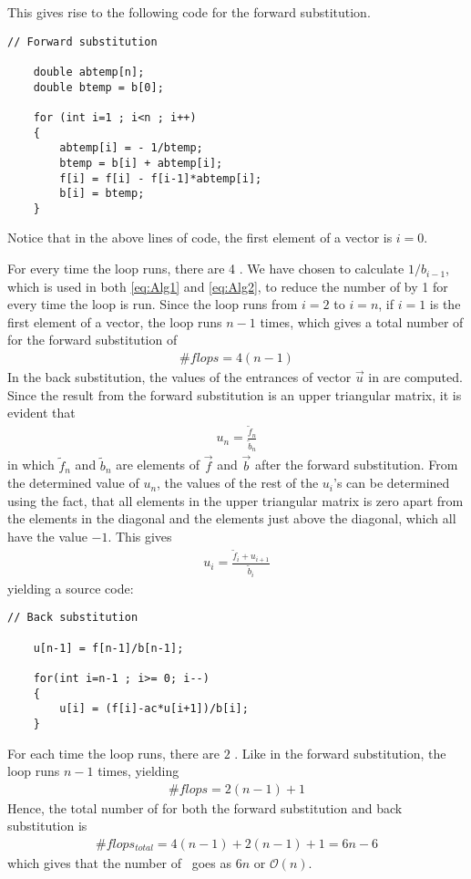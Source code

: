 This gives rise to the following code for the forward substitution.

\begin{lstlisting}
// Forward substitution

    double abtemp[n];
    double btemp = b[0];

    for (int i=1 ; i<n ; i++)
    {
        abtemp[i] = - 1/btemp;
        btemp = b[i] + abtemp[i];
        f[i] = f[i] - f[i-1]*abtemp[i];
        b[i] = btemp;
    }
\end{lstlisting}
Notice that in the above lines of code, the first element of a vector is $i=0$.

For every time the loop runs, there are 4 \flops . We have chosen to calculate $1/b_{i-1}$, which is used in both \eqref{eq:Alg1} and \eqref{eq:Alg2}, to reduce the number of \flops by 1 for every time the loop is run. 
Since the loop runs from $i=2$ to $i=n$, if $i=1$ is the first element of a vector, the loop runs $n-1$ times, which gives a total number of \flops for the forward substitution of
\begin{align}
	 \# flops = 4(n-1)
	 \label{eq:Alg3}
\end{align} 
In the back substitution, the values of the entrances of vector $\vec{u}$ in  are computed. 
Since the result from the forward substitution is an upper triangular matrix, it is evident that
\begin{align}
	u_n = \frac{\tilde{f}_n}{\tilde{b}_n}  
	\label{eq:Alg4}
\end{align}
in which $\tilde{f}_n$ and $\tilde{b}_n$ are elements of $\vec{f}$ and $\vec{b}$ after the forward substitution. 
From the determined value of $u_n$, the values of the rest of the $u_i$'s can be determined using the fact, that all elements in the upper triangular matrix is zero apart from the elements in the diagonal and the elements just above the diagonal, which all have the value $-1$. 
This gives
\begin{align}
	u_i = \frac{\tilde{f}_i + u_{i+1}}{\tilde{b}_i} 
	\label{eq:Alg5}
\end{align}
yielding a source code:
\begin{lstlisting}
// Back substitution

    u[n-1] = f[n-1]/b[n-1];

    for(int i=n-1 ; i>= 0; i--)
    {
        u[i] = (f[i]-ac*u[i+1])/b[i];
    }
\end{lstlisting} 
For each time the loop runs, there are $2$ \flops . Like in the forward substitution, the loop runs $n-1$ times, yielding
\begin{align}
	 \# flops = 2(n-1)+1
	 \label{eq:Alg6}
\end{align} 
Hence, the total number of \flops for both the forward substitution and back substitution is
\begin{align}
	 \# flops_{total} = 4(n-1)+2(n-1)+1 = 6n-6 
	 \label{eq:Alg7}
\end{align}  
which gives that the number of \flops \, goes as $6n$ or $\mathcal{O}(n)$.

